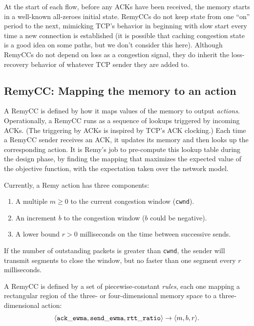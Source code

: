 
At the start of each flow, before any ACKs have been received, the
memory starts in a well-known all-zeroes initial state. RemyCCs do not
keep state from one ``on'' period to the next, mimicking TCP's
behavior in beginning with slow start every time a new connection is
established (it is possible that caching congestion state is a good
idea on some paths, but we don't consider this here). Although RemyCCs
do not depend on loss as a congestion signal, they do inherit the
loss-recovery behavior of whatever TCP sender they are added to.

\subsection{RemyCC: Mapping the memory to an action}

A RemyCC is defined by how it maps values of the memory to output
\emph{actions}. Operationally, a RemyCC runs as a sequence of lookups
triggered by incoming ACKs. (The triggering by ACKs is
inspired by TCP's ACK clocking.)  Each time a RemyCC sender receives
an ACK, it updates its memory and then looks up the corresponding
action. It is Remy's job to pre-compute this lookup table during the design
phase, by finding the mapping that maximizes the expected value of the
objective function, with the expectation taken over the network model.

Currently, a Remy action has three components:

\begin{enumerate}

\item A multiple $m \geq 0$ to the current congestion window ({\tt cwnd}).

\item An increment $b$ to the congestion window ($b$ could be negative).

\item A lower bound $r > 0$ milliseconds on the time between
  successive sends.

\end{enumerate}

If the number of outstanding packets is greater than {\tt cwnd}, the
sender will transmit segments to close the window, but no faster than
one segment every $r$ milliseconds.

A RemyCC is defined by a set of piecewise-constant \emph{rules}, each
one mapping a rectangular region of the three- or four-dimensional
memory space to a three-dimensional action:
$$
\langle {\tt ack\_ewma}, {\tt send\_ewma}, {\tt rtt\_ratio} \rangle \rightarrow
\langle m, b, r \rangle.
$$

